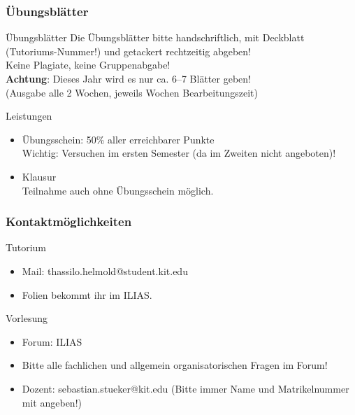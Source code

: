 \begin{frame}
	\frametitle{Übungsblätter}
	
	\begin{block}{Übungsblätter}
		Die Übungsblätter bitte handschriftlich, mit Deckblatt (Tutoriums-Nummer!) und getackert rechtzeitig	abgeben! \\ \pause
		Keine Plagiate, keine Gruppenabgabe! \\[1em] \pause
		\textbf{Achtung}: Dieses Jahr wird es nur ca. 6--7 Blätter geben! \\
		(Ausgabe alle 2 Wochen, jeweils  Wochen Bearbeitungszeit) 
	\end{block}
	\pause
	\begin{block}{Leistungen}
		\begin{itemize}
			\item Übungsschein: 50\% aller erreichbarer Punkte \\
				  Wichtig: Versuchen im ersten Semester (da im Zweiten nicht angeboten)!
			\item Klausur \\
				  Teilnahme auch ohne Übungsschein möglich.
		\end{itemize}
	\end{block}
\end{frame}

\begin{frame}
	\frametitle{Kontaktmöglichkeiten}
	
	\begin{block}{Tutorium}
		\begin{itemize}
			\item Mail: thassilo.helmold@student.kit.edu
			\item Folien bekommt ihr im ILIAS.
		\end{itemize} 
	\end{block}
	\pause
	
	\begin{block}{Vorlesung}
		\begin{itemize}
			\item Forum: ILIAS
			\item Bitte alle fachlichen und allgemein organisatorischen Fragen im Forum!
			\item Dozent: sebastian.stueker@kit.edu (Bitte immer Name und Matrikelnummer mit angeben!)
		\end{itemize}
	\end{block}
\end{frame}

